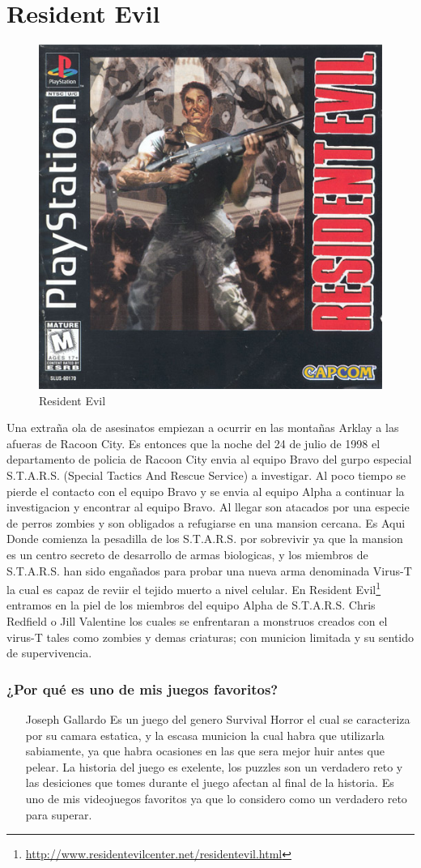 \section{Resident Evil}

\begin{figure}[htbp]
\begin{center}
\includegraphics[width=.35\textwidth]{./imagenes/resident_evil1.jpg}
\caption{Resident Evil}
\label{Resident Evil}
\end{center}
\end{figure}
Una extraña ola de asesinatos empiezan a ocurrir en las montañas Arklay a las afueras de Racoon City.  Es entonces que la noche del 24 de julio de 1998 el departamento de policia de Racoon City envia al equipo Bravo del gurpo especial S.T.A.R.S. (Special Tactics And Rescue Service) a investigar. Al poco tiempo se pierde el contacto con el equipo Bravo y se envia al equipo Alpha a continuar la investigacion y encontrar al equipo Bravo. Al llegar son atacados por una especie de perros zombies y son obligados a refugiarse en una mansion cercana. Es Aqui Donde comienza la pesadilla de los S.T.A.R.S. por sobrevivir ya que la mansion es un centro secreto de desarrollo de armas biologicas, y los miembros de S.T.A.R.S. han sido engañados para probar una nueva arma denominada Virus-T la cual es capaz de reviir el tejido muerto a nivel celular. En Resident Evil\footnote{\url{http://www.residentevilcenter.net/residentevil.html}} entramos en la piel de los miembros del equipo Alpha de S.T.A.R.S. Chris Redfield o Jill Valentine los cuales se enfrentaran a monstruos creados con el virus-T tales como zombies y demas criaturas; con municion limitada y su sentido de supervivencia.

\subsubsection{¿Por qué es uno de mis juegos favoritos?}
\begin{itemize}
\item[Joseph Gallardo] Es un juego del genero Survival Horror el cual se caracteriza por su camara estatica, y la escasa municion la cual habra que utilizarla sabiamente, ya que habra ocasiones en las que sera mejor huir antes que pelear. La historia del juego es exelente, los puzzles son un verdadero reto y las desiciones que tomes durante el juego afectan al final de la historia. Es uno de mis videojuegos favoritos ya que lo considero como un verdadero reto para superar.
\end{itemize}